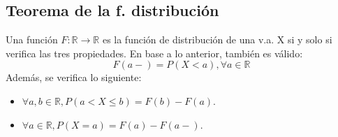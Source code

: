 \subsection{Teorema de la f. distribución}
Una función $F:\mathbb{R} \to \mathbb{R}$ es la función de distribución de una v.a. X si y solo si verifica las tres propiedades. En base a lo anterior, también es válido:
\[F(a-) = P(X<a), \forall a \in \mathbb{R}\]
Además, se verifica lo siguiente:
\begin{itemize}
\item $\forall a,b \in \mathbb{R}, P(a < X \leq b)=F(b)-F(a)$.
\item $\forall a \in \mathbb{R}, P(X=a)=F(a)-F(a-)$.
\end{itemize}